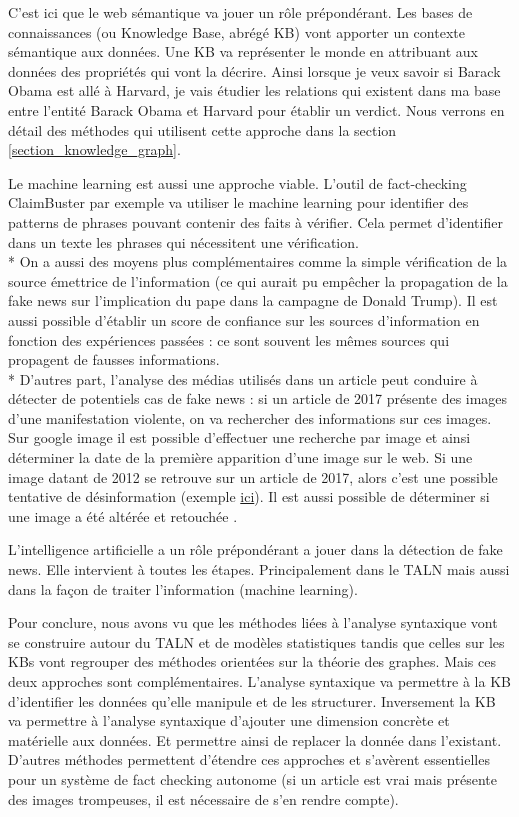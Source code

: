 C'est ici que le web sémantique va jouer un rôle prépondérant. Les bases de connaissances (ou Knowledge Base, abrégé KB) vont apporter un contexte sémantique aux données. Une KB va représenter le monde en attribuant aux données des propriétés qui vont la décrire. Ainsi lorsque je veux savoir si Barack Obama est allé à Harvard, je vais étudier les relations qui existent dans ma base entre l'entité Barack Obama et Harvard pour établir un verdict. Nous verrons en détail des méthodes qui utilisent cette approche dans la section \ref{section_knowledge_graph}.

Le machine learning est aussi une approche viable. L'outil de fact-checking ClaimBuster par exemple va utiliser le machine learning pour identifier des patterns de phrases pouvant contenir des faits à vérifier. Cela permet d'identifier dans un texte les phrases qui nécessitent une vérification. 
\\*
On a aussi des moyens plus complémentaires comme la simple vérification de la source émettrice de l'information (ce qui aurait pu empêcher la propagation de la fake news sur l'implication du pape dans la campagne  de Donald Trump). Il est aussi possible d'établir un score de confiance sur les sources d'information en fonction des expériences passées : ce sont souvent les mêmes sources qui propagent de fausses informations.
\\*
D'autres part, l'analyse des médias utilisés dans un article peut conduire à détecter de potentiels cas de fake news : si un article de 2017 présente des images d'une manifestation violente, on va rechercher des informations sur ces images. Sur google image il est possible d'effectuer une recherche par image et ainsi déterminer la date de la première apparition d'une image sur le web. Si une image datant de 2012 se retrouve sur un article de 2017, alors c'est une possible tentative de désinformation (exemple \href{https://www.lemonde.fr/les-decodeurs/article/2017/10/02/violences-policieres-en-catalogne-attention-aux-images-trompeuses_5194905_4355770.html}{ici}). Il est aussi possible de déterminer si une image a été altérée et retouchée \cite{krawetz2007picture}.

L'intelligence artificielle a un rôle prépondérant a jouer dans la détection de fake news. Elle intervient à toutes les étapes. Principalement dans le TALN mais aussi dans la façon de traiter l'information (machine learning).

Pour conclure, nous avons vu que les méthodes liées à l'analyse syntaxique vont se construire autour du TALN et de modèles statistiques tandis que celles sur les KBs vont regrouper des méthodes orientées sur la théorie des graphes. Mais ces deux approches sont complémentaires. L'analyse syntaxique va permettre à la KB d'identifier les données qu'elle manipule et de les structurer. Inversement la KB va permettre à l'analyse syntaxique d'ajouter une dimension concrète et matérielle aux données. Et permettre ainsi de replacer la donnée dans l'existant. D'autres méthodes permettent d'étendre ces approches et s'avèrent essentielles pour un système de fact checking autonome (si un article est vrai mais présente des images trompeuses, il est nécessaire de s'en rendre compte).

